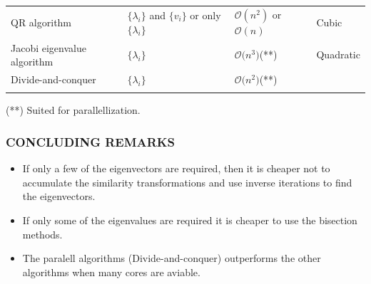 \documentclass[a4paper,8pt]{beamer} %
\begin{document}
\begin{frame}
\begin{itemize}
\begin{table}
\begin{Tiny}
\begin{tabular}{llll}
							QR algorithm 				& $\{\lambda_i\}$ and $\{v_i\}$ or only $\{\lambda_i\}$ & $\mathcal O(n^2)$ or $\mathcal O(n)$ & Cubic\\
							Jacobi eigenvalue algorithm	& $\{\lambda_i\}$ 	& $\mathcal O\mathcal(n^3)$(**) & Quadratic \\
							Divide-and-conquer 			& $\{\lambda_i\}$ 	& $\mathcal O\mathcal(n^{2})$(**) & \\
							\\
							\hline
							\hline
						\end{tabular}
					\end{Tiny}
				\end{table}
				\begin{tiny}
					(**) Suited for parallellization.
				\end{tiny}
		\end{itemize}
\end{frame}%

\begin{frame}%
\frametitle{CONCLUDING REMARKS}
	\begin{itemize}
		\item If only a few of the eigenvectors are required, then it is cheaper not to accumulate the similarity 
			transformations and use inverse iterations to find the eigenvectors. 
		\item If only some of the eigenvalues are required it is cheaper to use the bisection methods.
		\item The paralell algorithms (Divide-and-conquer) outperforms the other algorithms when many cores are 
			aviable.
	\end{itemize}
\end{frame}%
\end{document}
